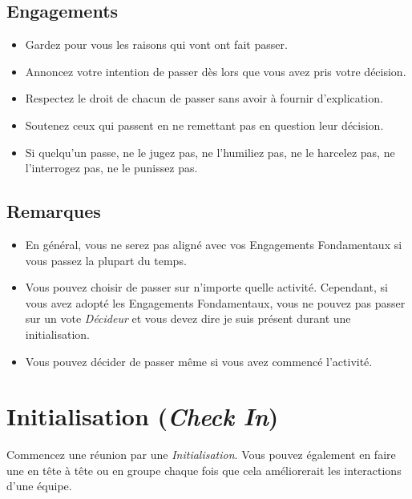 \documentclass[paper=6in:9in,pagesize=pdftex,headinclude=on,footinclude=on,11pt]{scrbook}
\let\oldsection\section
\renewcommand\section{\clearpage\oldsection}
\begin{document}
\subsection{Engagements}
\begin{itemize}
	\item Gardez pour vous les raisons qui vont ont fait passer.
	\item Annoncez votre intention de passer dès lors que vous avez pris votre décision.
	\item Respectez le droit de chacun de passer sans avoir à fournir d'explication.
	\item Soutenez ceux qui passent en ne remettant pas en question leur décision.
	\item Si quelqu'un passe, ne le jugez pas, ne l'humiliez pas, ne le harcelez pas, ne l'interrogez pas, ne le punissez pas.
\end{itemize}

\subsection{Remarques}
\begin{itemize}
	\item En général, vous ne serez pas aligné avec vos Engagements Fondamentaux si vous passez la plupart du temps.
	\item Vous pouvez choisir de passer sur n'importe quelle activité. Cependant, si vous avez adopté les Engagements
	      Fondamentaux, vous ne pouvez pas passer sur un vote \emph{Décideur} et vous devez dire \og{}je suis présent\fg{}
	      durant une initialisation.
	\item Vous pouvez décider de passer même si vous avez commencé l'activité.
\end{itemize}

\section{Initialisation (\emph{Check In})} \label{initialisation}

Commencez une réunion par une \emph{Initialisation}. Vous pouvez également en faire une en tête à tête ou en groupe chaque fois que
cela améliorerait les interactions d'une équipe.
\end{document}
